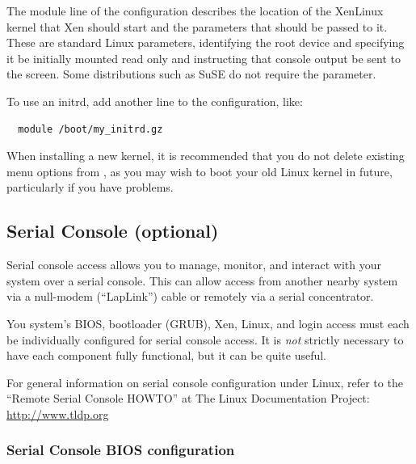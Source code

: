 \documentclass[11pt,twoside,final,openright]{report}
\begin{document}
The module line of the configuration describes the location of the
XenLinux kernel that Xen should start and the parameters that should be
passed to it. These are standard Linux parameters, identifying the root
device and specifying it be initially mounted read only and instructing
that console output be sent to the screen. Some distributions such as
SuSE do not require the  parameter.


To use an initrd, add another  line to the configuration,
like: {\small
\begin{verbatim}
  module /boot/my_initrd.gz
\end{verbatim}
}


When installing a new kernel, it is recommended that you do not delete
existing menu options from , as you may wish to boot your
old Linux kernel in future, particularly if you have problems.

\subsection{Serial Console (optional)}

Serial console access allows you to manage, monitor, and interact with
your system over a serial console.  This can allow access from another
nearby system via a null-modem (``LapLink'') cable or remotely via a serial
concentrator.

You system's BIOS, bootloader (GRUB), Xen, Linux, and login access must
each be individually configured for serial console access.  It is
\emph{not} strictly necessary to have each component fully functional,
but it can be quite useful.

For general information on serial console configuration under Linux,
refer to the ``Remote Serial Console HOWTO'' at The Linux Documentation
Project: \url{http://www.tldp.org} 

\subsubsection{Serial Console BIOS configuration}
\end{document}
